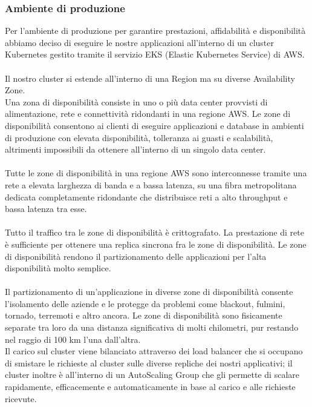 \documentclass{article}
\begin{document}
\subsubsection{Ambiente di produzione}
Per l’ambiente di produzione per garantire prestazioni, affidabilità e disponibilità abbiamo deciso di eseguire le nostre applicazioni all’interno di un cluster Kubernetes gestito tramite il servizio EKS (Elastic Kubernetes Service) di AWS.\\
\\Il nostro cluster si estende all’interno di una Region ma su diverse Availability Zone.\\
Una zona di disponibilità consiste in uno o più data center provvisti di alimentazione, rete e connettività ridondanti in una regione AWS. Le zone di disponibilità consentono ai clienti di eseguire applicazioni e database in ambienti di produzione con elevata disponibilità, tolleranza ai guasti e scalabilità, altrimenti impossibili da ottenere all'interno di un singolo data center.\\
\\
Tutte le zone di disponibilità in una regione AWS sono interconnesse tramite una rete a elevata larghezza di banda e a bassa latenza, su una fibra metropolitana dedicata completamente ridondante che distribuisce reti a alto throughput e bassa latenza tra esse. \\
\\Tutto il traffico tra le zone di disponibilità è crittografato. La prestazione di rete è sufficiente per ottenere una replica sincrona fra le zone di disponibilità. Le zone di disponibilità rendono il partizionamento delle applicazioni per l'alta disponibilità molto semplice. 
\\ \\Il partizionamento di un'applicazione in diverse zone di disponibilità consente l'isolamento delle aziende e le protegge da problemi come blackout, fulmini, tornado, terremoti e altro ancora. Le zone di disponibilità sono fisicamente separate tra loro da una distanza significativa di molti chilometri, pur restando nel raggio di 100 km l'una dall'altra.
\\
Il carico sul cluster viene bilanciato attraverso dei load balancer che si occupano di smistare le richieste al cluster sulle diverse repliche dei nostri applicativi; il cluster inoltre è all’interno di un AutoScaling Group che gli permette di scalare rapidamente, efficacemente e automaticamente in base al carico e alle richieste ricevute.\\ \\
\end{document}
